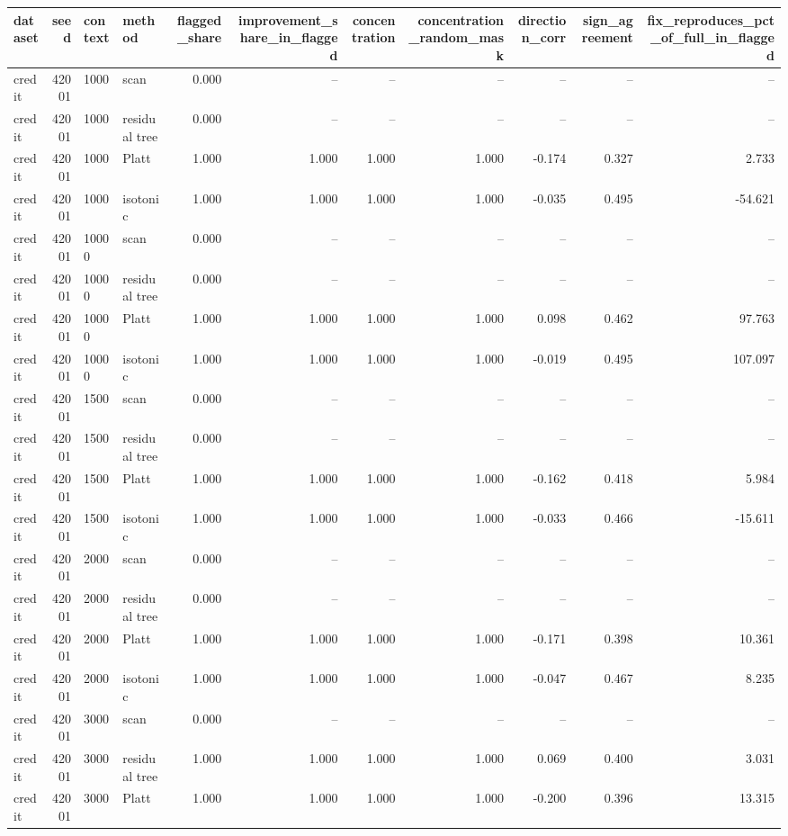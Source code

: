 \begin{tabular}{lrllrrrrrrr}
\toprule
dataset & seed & context & method & flagged_share & improvement_share_in_flagged & concentration & concentration_random_mask & direction_corr & sign_agreement & fix_reproduces_pct_of_full_in_flagged \\
\midrule
credit & 42001 & 1000 & scan & 0.000 & -- & -- & -- & -- & -- & -- \\
credit & 42001 & 1000 & residual tree & 0.000 & -- & -- & -- & -- & -- & -- \\
credit & 42001 & 1000 & Platt & 1.000 & 1.000 & 1.000 & 1.000 & -0.174 & 0.327 & 2.733 \\
credit & 42001 & 1000 & isotonic & 1.000 & 1.000 & 1.000 & 1.000 & -0.035 & 0.495 & -54.621 \\
credit & 42001 & 10000 & scan & 0.000 & -- & -- & -- & -- & -- & -- \\
credit & 42001 & 10000 & residual tree & 0.000 & -- & -- & -- & -- & -- & -- \\
credit & 42001 & 10000 & Platt & 1.000 & 1.000 & 1.000 & 1.000 & 0.098 & 0.462 & 97.763 \\
credit & 42001 & 10000 & isotonic & 1.000 & 1.000 & 1.000 & 1.000 & -0.019 & 0.495 & 107.097 \\
credit & 42001 & 1500 & scan & 0.000 & -- & -- & -- & -- & -- & -- \\
credit & 42001 & 1500 & residual tree & 0.000 & -- & -- & -- & -- & -- & -- \\
credit & 42001 & 1500 & Platt & 1.000 & 1.000 & 1.000 & 1.000 & -0.162 & 0.418 & 5.984 \\
credit & 42001 & 1500 & isotonic & 1.000 & 1.000 & 1.000 & 1.000 & -0.033 & 0.466 & -15.611 \\
credit & 42001 & 2000 & scan & 0.000 & -- & -- & -- & -- & -- & -- \\
credit & 42001 & 2000 & residual tree & 0.000 & -- & -- & -- & -- & -- & -- \\
credit & 42001 & 2000 & Platt & 1.000 & 1.000 & 1.000 & 1.000 & -0.171 & 0.398 & 10.361 \\
credit & 42001 & 2000 & isotonic & 1.000 & 1.000 & 1.000 & 1.000 & -0.047 & 0.467 & 8.235 \\
credit & 42001 & 3000 & scan & 0.000 & -- & -- & -- & -- & -- & -- \\
credit & 42001 & 3000 & residual tree & 1.000 & 1.000 & 1.000 & 1.000 & 0.069 & 0.400 & 3.031 \\
credit & 42001 & 3000 & Platt & 1.000 & 1.000 & 1.000 & 1.000 & -0.200 & 0.396 & 13.315 \\

\end{tabular}
